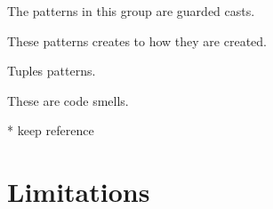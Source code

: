 
The patterns in this group are guarded casts.








These patterns creates to how they are created.







% 



Tuples patterns.






These are code smells.













* keep reference \cite{altidorTamingWildcardsCombining2011}

\section{Limitations}